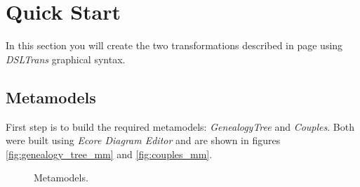 ﻿\section{Quick Start}
\label{sec:quick_start}



In this section you will create the two transformations
described in page \pageref{subsubsec:metaphor} using \emph{DSLTrans} graphical
syntax.

\subsection{Metamodels}

First step is to build the required metamodels: \emph{GenealogyTree} and
\emph{Couples}. Both were built using \emph{Ecore Diagram Editor} and are shown
in figures \ref{fig:genealogy_tree_mm} and \ref{fig:couples_mm}. 

\begin{figure}[h]
\begin{center}
  \caption{Metamodels.}
  \label{fig:genTree_couples_metamodels}
\end{center}
\end{figure}

